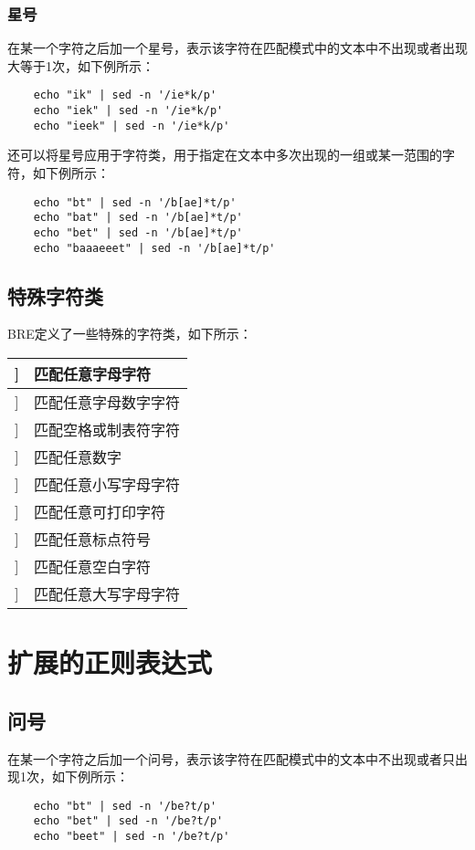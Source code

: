 \documentclass[a4paper,left=1.5cm,right=1.5cm,11pt]{article}
\begin{document}
\subsubsection{星号}
	在某一个字符之后加一个星号，表示该字符在匹配模式中的文本中不出现或者出现大等于1次，如下例所示：
	\begin{lstlisting}
	echo "ik" | sed -n '/ie*k/p'
	echo "iek" | sed -n '/ie*k/p'
	echo "ieek" | sed -n '/ie*k/p'
	\end{lstlisting}

	还可以将星号应用于字符类，用于指定在文本中多次出现的一组或某一范围的字符，如下例所示：
	\begin{lstlisting}
	echo "bt" | sed -n '/b[ae]*t/p'
	echo "bat" | sed -n '/b[ae]*t/p'
	echo "bet" | sed -n '/b[ae]*t/p'
	echo "baaaeeet" | sed -n '/b[ae]*t/p'
	\end{lstlisting}

\subsection{特殊字符类}
	BRE定义了一些特殊的字符类，如下所示：
	\begin{longtable}{p{2cm}p{5cm}}
	\hline
	[[:alpha:]] & 匹配任意字母字符 \\
	\hline
	[[:alnum:]] & 匹配任意字母数字字符 \\
	\hline
	[[:blank:]] & 匹配空格或制表符字符 \\
	\hline
	[[:digit:]] & 匹配任意数字 \\
	\hline
	[[:lower:]] & 匹配任意小写字母字符 \\
	\hline
	[[:print:]] & 匹配任意可打印字符 \\
	\hline
	[[:punct:]] & 匹配任意标点符号 \\
	\hline
	[[:space:]] & 匹配任意空白字符 \\
	\hline
	[[:upper:]] & 匹配任意大写字母字符 \\
	\hline
	\end{longtable}

\section{扩展的正则表达式}
\subsection{问号}
	在某一个字符之后加一个问号，表示该字符在匹配模式中的文本中不出现或者只出现1次，如下例所示：
	\begin{lstlisting}
	echo "bt" | sed -n '/be?t/p'
	echo "bet" | sed -n '/be?t/p'
	echo "beet" | sed -n '/be?t/p'
	\end{lstlisting}
\end{document}
